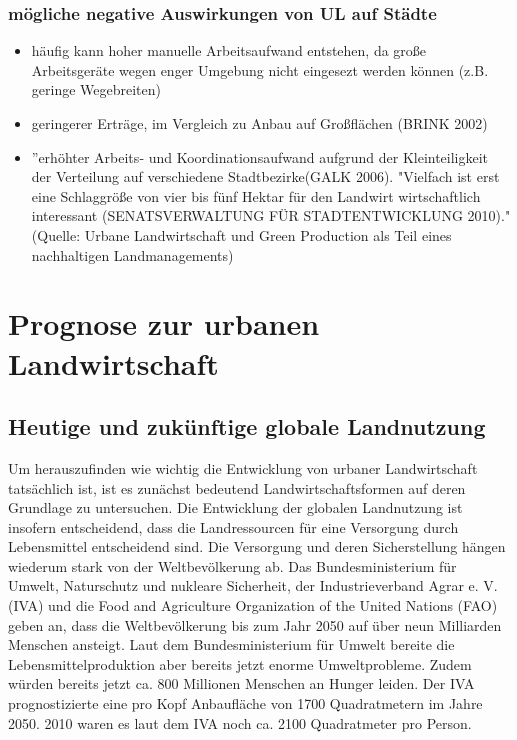 \documentclass{scrartcl}
\begin{document}
 \subsubsection{mögliche negative Auswirkungen von UL auf Städte}
 \begin{itemize}
     \item häufig kann hoher manuelle Arbeitsaufwand entstehen, da große Arbeitsgeräte wegen enger Umgebung nicht eingesezt werden können (z.B. geringe Wegebreiten)
     \item geringerer Erträge, im Vergleich zu Anbau auf Großflächen (BRINK 2002)
     \item ”erhöhter Arbeits‐ und Koordinationsaufwand aufgrund der Kleinteiligkeit der Verteilung auf verschiedene Stadtbezirke(GALK 2006). "Vielfach ist erst eine Schlaggröße von vier bis fünf Hektar für den Landwirt wirtschaftlich interessant (SENATSVERWALTUNG FÜR STADTENTWICKLUNG 2010)." (Quelle: Urbane Landwirtschaft und Green Production als Teil eines nachhaltigen Landmanagements)
 \end{itemize}
\section{Prognose zur urbanen Landwirtschaft}
\subsection{Heutige und zukünftige globale Landnutzung}

Um herauszufinden wie wichtig die Entwicklung von urbaner Landwirtschaft tatsächlich ist, ist es zunächst bedeutend Landwirtschaftsformen auf deren Grundlage zu untersuchen. Die Entwicklung der globalen Landnutzung ist insofern entscheidend, dass die Landressourcen für eine Versorgung durch Lebensmittel entscheidend sind. Die Versorgung und deren Sicherstellung hängen wiederum stark von der Weltbevölkerung ab. Das Bundesministerium für Umwelt, Naturschutz und nukleare Sicherheit, der Industrieverband Agrar e. V. (IVA) und die Food and Agriculture Organization of the United Nations (FAO) geben an, dass die Weltbevölkerung bis zum Jahr 2050 auf über neun Milliarden Menschen ansteigt. Laut dem Bundesministerium für Umwelt bereite die Lebensmittelproduktion aber bereits jetzt enorme Umweltprobleme. Zudem würden bereits jetzt ca. 800 Millionen Menschen an Hunger leiden. Der IVA prognostizierte eine pro Kopf Anbaufläche von 1700 Quadratmetern im Jahre 2050. 2010 waren es laut dem IVA noch ca. 2100 Quadratmeter pro Person.
\end{document}

